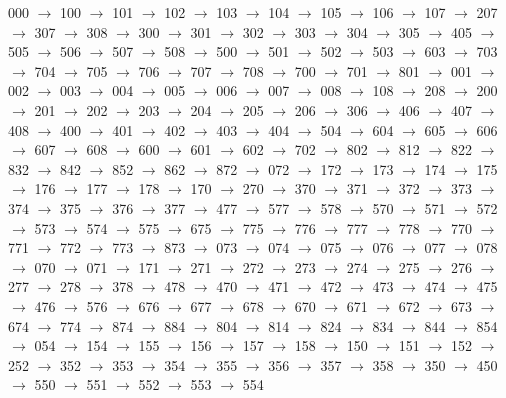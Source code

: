 000 $\rightarrow$ 100 $\rightarrow$ 101 $\rightarrow$ 102 $\rightarrow$ 103 $\rightarrow$ 104 $\rightarrow$ 105 $\rightarrow$ 106 $\rightarrow$ 107 $\rightarrow$ 207 $\rightarrow$ 307 $\rightarrow$ 308 $\rightarrow$ 300 $\rightarrow$ 301 $\rightarrow$ 302 $\rightarrow$ 303 $\rightarrow$ 304 $\rightarrow$ 305 $\rightarrow$ 405 $\rightarrow$ 505 $\rightarrow$ 506 $\rightarrow$ 507 $\rightarrow$ 508 $\rightarrow$ 500 $\rightarrow$ 501 $\rightarrow$ 502 $\rightarrow$ 503 $\rightarrow$ 603 $\rightarrow$ 703 $\rightarrow$ 704 $\rightarrow$ 705 $\rightarrow$ 706 $\rightarrow$ 707 $\rightarrow$ 708 $\rightarrow$ 700 $\rightarrow$ 701 $\rightarrow$ 801 $\rightarrow$ 001 $\rightarrow$ 002 $\rightarrow$ 003 $\rightarrow$ 004 $\rightarrow$ 005 $\rightarrow$ 006 $\rightarrow$ 007 $\rightarrow$ 008 $\rightarrow$ 108 $\rightarrow$ 208 $\rightarrow$ 200 $\rightarrow$ 201 $\rightarrow$ 202 $\rightarrow$ 203 $\rightarrow$ 204 $\rightarrow$ 205 $\rightarrow$ 206 $\rightarrow$ 306 $\rightarrow$ 406 $\rightarrow$ 407 $\rightarrow$ 408 $\rightarrow$ 400 $\rightarrow$ 401 $\rightarrow$ 402 $\rightarrow$ 403 $\rightarrow$ 404 $\rightarrow$ 504 $\rightarrow$ 604 $\rightarrow$ 605 $\rightarrow$ 606 $\rightarrow$ 607 $\rightarrow$ 608 $\rightarrow$ 600 $\rightarrow$ 601 $\rightarrow$ 602 $\rightarrow$ 702 $\rightarrow$ 802 $\rightarrow$ 812 $\rightarrow$ 822 $\rightarrow$ 832 $\rightarrow$ 842 $\rightarrow$ 852 $\rightarrow$ 862 $\rightarrow$ 872 $\rightarrow$ 072 $\rightarrow$ 172 $\rightarrow$ 173 $\rightarrow$ 174 $\rightarrow$ 175 $\rightarrow$ 176 $\rightarrow$ 177 $\rightarrow$ 178 $\rightarrow$ 170 $\rightarrow$ 270 $\rightarrow$ 370 $\rightarrow$ 371 $\rightarrow$ 372 $\rightarrow$ 373 $\rightarrow$ 374 $\rightarrow$ 375 $\rightarrow$ 376 $\rightarrow$ 377 $\rightarrow$ 477 $\rightarrow$ 577 $\rightarrow$ 578 $\rightarrow$ 570 $\rightarrow$ 571 $\rightarrow$ 572 $\rightarrow$ 573 $\rightarrow$ 574 $\rightarrow$ 575 $\rightarrow$ 675 $\rightarrow$ 775 $\rightarrow$ 776 $\rightarrow$ 777 $\rightarrow$ 778 $\rightarrow$ 770 $\rightarrow$ 771 $\rightarrow$ 772 $\rightarrow$ 773 $\rightarrow$ 873 $\rightarrow$ 073 $\rightarrow$ 074 $\rightarrow$ 075 $\rightarrow$ 076 $\rightarrow$ 077 $\rightarrow$ 078 $\rightarrow$ 070 $\rightarrow$ 071 $\rightarrow$ 171 $\rightarrow$ 271 $\rightarrow$ 272 $\rightarrow$ 273 $\rightarrow$ 274 $\rightarrow$ 275 $\rightarrow$ 276 $\rightarrow$ 277 $\rightarrow$ 278 $\rightarrow$ 378 $\rightarrow$ 478 $\rightarrow$ 470 $\rightarrow$ 471 $\rightarrow$ 472 $\rightarrow$ 473 $\rightarrow$ 474 $\rightarrow$ 475 $\rightarrow$ 476 $\rightarrow$ 576 $\rightarrow$ 676 $\rightarrow$ 677 $\rightarrow$ 678 $\rightarrow$ 670 $\rightarrow$ 671 $\rightarrow$ 672 $\rightarrow$ 673 $\rightarrow$ 674 $\rightarrow$ 774 $\rightarrow$ 874 $\rightarrow$ 884 $\rightarrow$ 804 $\rightarrow$ 814 $\rightarrow$ 824 $\rightarrow$ 834 $\rightarrow$ 844 $\rightarrow$ 854 $\rightarrow$ 054 $\rightarrow$ 154 $\rightarrow$ 155 $\rightarrow$ 156 $\rightarrow$ 157 $\rightarrow$ 158 $\rightarrow$ 150 $\rightarrow$ 151 $\rightarrow$ 152 $\rightarrow$ 252 $\rightarrow$ 352 $\rightarrow$ 353 $\rightarrow$ 354 $\rightarrow$ 355 $\rightarrow$ 356 $\rightarrow$ 357 $\rightarrow$ 358 $\rightarrow$ 350 $\rightarrow$ 450 $\rightarrow$ 550 $\rightarrow$ 551 $\rightarrow$ 552 $\rightarrow$ 553 $\rightarrow$ 554 